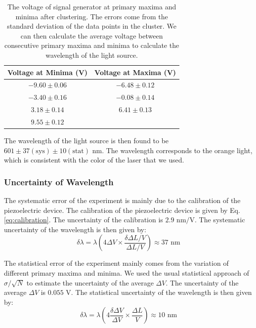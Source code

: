\begin{table}[h]
    \centering
    \begin{tabular}{|c|c|}
        \hline
        \textbf{Voltage at Minima (V)} & \textbf{Voltage at Maxima (V)} \\
        \hline
        $-9.60 \pm 0.06$ & $-6.48 \pm 0.12$ \\
        \hline
        $-3.40 \pm 0.16$ & $-0.08 \pm 0.14$ \\
        \hline
        $3.18 \pm 0.14$  & $6.41 \pm 0.13$  \\
        \hline
        $9.55 \pm 0.12$  &  \\
        \hline
    \end{tabular}
    \caption{The voltage of signal generator at primary maxima and minima after clustering. The errors come from the standard deviation of the data points in the cluster. We can then calculate the average voltage between consecutive primary maxima and minima to calculate the wavelength of the light source.}
    \label{tab:minima_maxima}
\end{table}

The wavelength of the light source is then found to be $601\pm37(\text{sys})\pm10(\text{stat})\text{ nm}$. The wavelength corresponds to the orange light, which is consistent with the color of the laser that we used.

\subsubsection{Uncertainty of Wavelength}
The systematic error of the experiment is mainly due to the calibration of the piezoelectric device. The calibration of the piezoelectric device is given by Eq. \eqref{eq:calibration}. The uncertainty of the calibration is $2.9 \text{ nm/V}$. The systematic uncertainty of the wavelength is then given by:
\begin{equation}
    \delta \lambda = \lambda \left(4 \Delta V \times  \frac{\delta \Delta L / V}{\Delta L/V}\right) \approx 37 \text{ nm}
\end{equation}

The statistical error of the experiment mainly comes from the variation of different primary maxima and minima. We used the usual statistical approach of $\sigma/\sqrt{N}$ to estimate the uncertainty of the average $\Delta V$. The uncertainty of the average $\Delta V$ is $0.055 \text{ V}$. The statistical uncertainty of the wavelength is then given by:
\begin{equation}
    \delta \lambda = \lambda \left(4 \frac{\delta \Delta V}{\Delta V} \times \frac{\Delta L}{V}\right) \approx 10 \text{ nm}
\end{equation}
 

